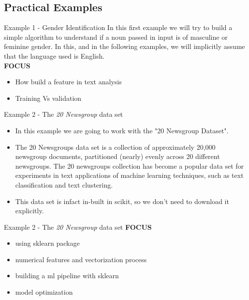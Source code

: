 \documentclass[11pt]{beamer}
\begin{document}
\subsection{Practical Examples \\ \scalebox{0.8}{}}
\begin{frame}{Example 1 - Gender Identification}
In this first example we will try to build a simple algorithm to understand if a noun passed in input is of masculine or feminine gender. In this, and in the following examples, we will implicitly assume that the language used is English.
\\
\vspace{0.5cm}
\textbf{FOCUS}
\\
	\begin{itemize}
		\item How build a feature in text analysis
		\item Training Vs validation
	\end{itemize}
\end{frame}
\begin{frame}{Example 2 - The \textit{20 Newsgroup} data set}
	\begin{itemize}
		\item In this example we are going to work with the "20 Newsgroup Dataset". 
		\item The 20 Newsgroups data set is a collection of approximately 20,000 newsgroup documents, partitioned (nearly) evenly across 20 different newsgroups. The 20 newsgroups collection has become a popular data set for experiments in text applications of machine learning techniques, such as text classification and text clustering. 
		\item This data set is infact in-built in scikit, so we don’t need to download it explicitly.
	\end{itemize}
\end{frame}
\begin{frame}{Example 2 - The \textit{20 Newsgroup} data set}
	\textbf{FOCUS}
	\vspace{0.5cm}
	\begin{itemize}
		\item using sklearn package
		\item numerical features and vectorization process
		\item building a ml pipeline with sklearn
		\item model optimization
	\end{itemize}
\end{frame}
\end{document}
